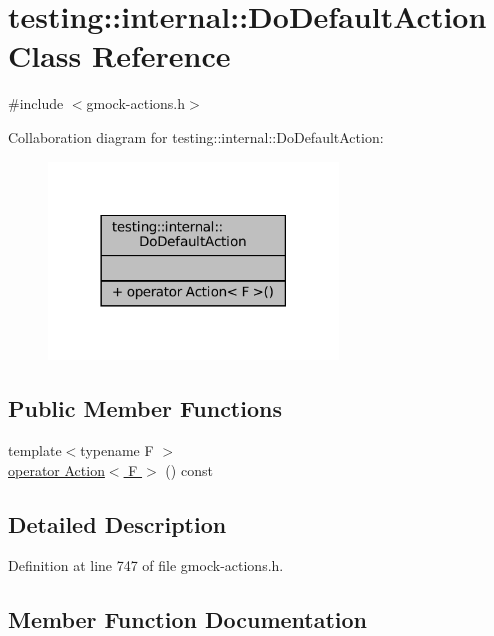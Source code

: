\hypertarget{classtesting_1_1internal_1_1DoDefaultAction}{}\section{testing\+:\+:internal\+:\+:Do\+Default\+Action Class Reference}
\label{classtesting_1_1internal_1_1DoDefaultAction}


{\ttfamily \#include $<$gmock-\/actions.\+h$>$}



Collaboration diagram for testing\+:\+:internal\+:\+:Do\+Default\+Action\+:
\nopagebreak
\begin{figure}[H]
\begin{center}
\leavevmode
\includegraphics[width=218pt]{classtesting_1_1internal_1_1DoDefaultAction__coll__graph}
\end{center}
\end{figure}
\subsection*{Public Member Functions}
\begin{DoxyCompactItemize}
\item 
{\footnotesize template$<$typename F $>$ }\\\hyperlink{classtesting_1_1internal_1_1DoDefaultAction_aea08828a0d64847e29ab7a5abeb74149}{operator Action$<$ F $>$} () const
\end{DoxyCompactItemize}


\subsection{Detailed Description}


Definition at line 747 of file gmock-\/actions.\+h.



\subsection{Member Function Documentation}
\mbox{\label{classtesting_1_1internal_1_1DoDefaultAction_aea08828a0d64847e29ab7a5abeb74149}} 
